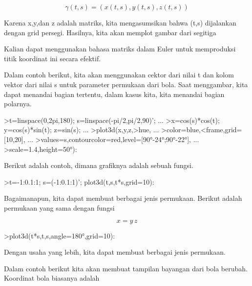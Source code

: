 \documentclass{article}
\begin{document}
\begin{eulernotebook}
\begin{eulercomment}
\end{eulercomment}
\begin{eulerformula}
\[
\gamma(t,s) = (x(t,s),y(t,s),z(t,s))
\]
\end{eulerformula}
\begin{eulercomment}
Karena x,y,dan z adalah matriks, kita mengasumsikan bahwa (t,s)
dijalankan dengan grid persegi. Hasilnya, kita akan memplot gambar
dari segitiga

Kalian dapat menggunakan bahasa matriks dalam Euler untuk memproduksi
titik koordinat ini secara efektif.

Dalam contoh berikut, kita akan menggunakan cektor dari nilai t dan
kolom vektor dari nilai s untuk parameter permukaan dari bola. Saat
menggambar, kita dapat menandai bagian tertentu, dalam kasus kita,
kita menandai bagian polarnya.
\end{eulercomment}
\begin{eulerprompt}
>t=linspace(0,2pi,180); s=linspace(-pi/2,pi/2,90)'; ...
>x=cos(s)*cos(t); y=cos(s)*sin(t); z=sin(s); ...
>plot3d(x,y,z,>hue, ...
>color=blue,<frame,grid=[10,20], ...
>values=s,contourcolor=red,level=[90°-24°;90°-22°], ...
>scale=1.4,height=50°):
\end{eulerprompt}
\begin{eulercomment}
Berikut adalah contoh, dimana grafiknya adalah sebuah fungsi.
\end{eulercomment}
\begin{eulerprompt}
>t=-1:0.1:1; s=(-1:0.1:1)'; plot3d(t,s,t*s,grid=10):
\end{eulerprompt}
\begin{eulercomment}
Bagaimanapun, kita dapat membuat berbagai jenis permukaan. Berikut
adalah permukaan yang sama dengan fungsi

\end{eulercomment}
\begin{eulerformula}
\[
x = y \, z
\]
\end{eulerformula}
\begin{eulerprompt}
>plot3d(t*s,t,s,angle=180°,grid=10):
\end{eulerprompt}
\begin{eulercomment}
Dengan usaha yang lebih, kita dapat membuat berbagai jenis permukaan.

Dalam contoh berikut kita akan membuat tampilan bayangan dari bola
berubah. Koordinat bola biasanya adalah


\end{eulercomment}
\end{eulernotebook}
\end{document}

